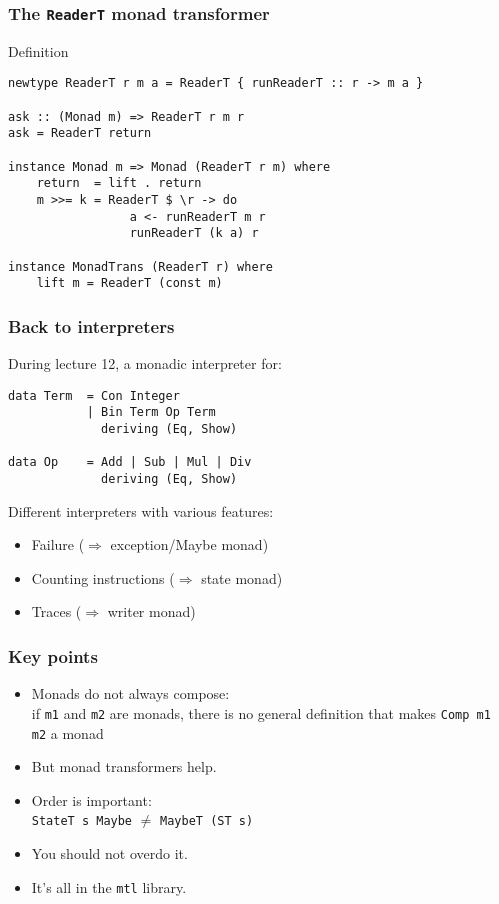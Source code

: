 \documentclass[pdftex,aspectratio=169]{beamer}
\begin{document}
\begin{frame}[fragile]
  \frametitle{The \texttt{ReaderT} monad transformer}
  \begin{block}{Definition}
\begin{lstlisting}
newtype ReaderT r m a = ReaderT { runReaderT :: r -> m a }

ask :: (Monad m) => ReaderT r m r
ask = ReaderT return

instance Monad m => Monad (ReaderT r m) where
    return  = lift . return
    m >>= k = ReaderT $ \r -> do
                 a <- runReaderT m r
                 runReaderT (k a) r

instance MonadTrans (ReaderT r) where
    lift m = ReaderT (const m)
\end{lstlisting}
  \end{block}
\end{frame}

\begin{frame}[fragile]
  \frametitle{Back to interpreters}

  \begin{block}{During lecture 12, a monadic interpreter for:}
    \begin{lstlisting}
data Term  = Con Integer
           | Bin Term Op Term
             deriving (Eq, Show)

data Op    = Add | Sub | Mul | Div
             deriving (Eq, Show)
    \end{lstlisting}
  \end{block}
  \pause
  Different interpreters with various features:
  \begin{itemize}
  \item Failure ($\Rightarrow$ exception/Maybe monad)
  \item Counting instructions ($\Rightarrow$ state monad)
  \item Traces ($\Rightarrow$ writer monad)
  \end{itemize}
\end{frame}


\begin{frame}
  \frametitle{Key points}
  \begin{itemize}[<+->]
  \item Monads do not always compose:\\ if \lstinline{m1} and
    \lstinline{m2} are monads, 
    there is no general definition that makes \lstinline{Comp m1 m2} a
    monad 
  \item But monad transformers help.
  \item Order is important:\\
    \lstinline{StateT s Maybe} $\ne$ \lstinline{MaybeT (ST s)}
  \item You should not overdo it.
  \item It's all in the \lstinline{mtl} library.
  \end{itemize}
\end{frame}
\end{document}
